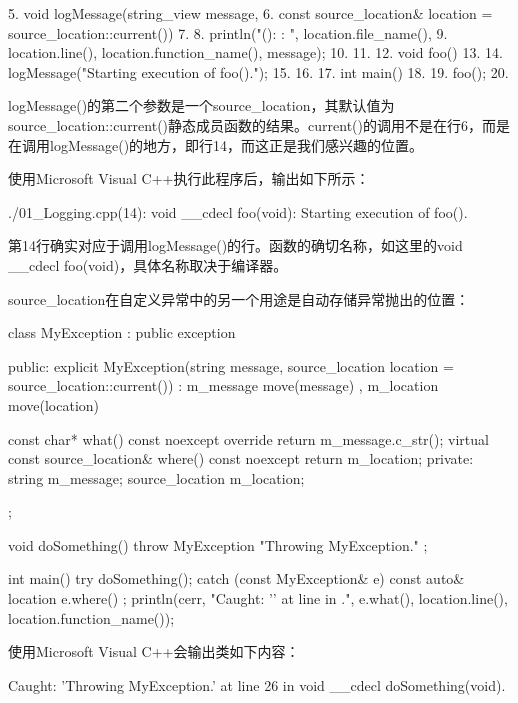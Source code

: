 \begin{shell}
5.  void logMessage(string_view message,
6.  const source_location& location = source_location::current())
7.  {
8.      println("{}({}): {}: {}", location.file_name(),
9.      location.line(), location.function_name(), message);
10. }
11.
12. void foo()
13. {
14.     logMessage("Starting execution of foo().");
15. }
16.
17. int main()
18. {
19.     foo();
20. }
\end{shell}

logMessage()的第二个参数是一个source\_location，其默认值为source\_location::current()静态成员函数的结果。current()的调用不是在行6，而是在调用logMessage()的地方，即行14，而这正是我们感兴趣的位置。

使用Microsoft Visual C++执行此程序后，输出如下所示：

\begin{shell}
./01_Logging.cpp(14): void __cdecl foo(void): Starting execution of foo().
\end{shell}

第14行确实对应于调用logMessage()的行。函数的确切名称，如这里的void \_\_cdecl foo(void)，具体名称取决于编译器。


source\_location在自定义异常中的另一个用途是自动存储异常抛出的位置：

\begin{cpp}
class MyException : public exception
{
    public:
        explicit MyException(string message,
            source_location location = source_location::current())
            : m_message { move(message) }
            , m_location { move(location) }
        { }

        const char* what() const noexcept override { return m_message.c_str(); }
        virtual const source_location& where() const noexcept{ return m_location; }
    private:
        string m_message;
        source_location m_location;
};

void doSomething()
{
    throw MyException { "Throwing MyException." };
}

int main()
{
    try {
        doSomething();
    } catch (const MyException& e) {
        const auto& location { e.where() };
        println(cerr, "Caught: '{}' at line {} in {}.",
            e.what(), location.line(), location.function_name());
    }
}
\end{cpp}

使用Microsoft Visual C++会输出类如下内容：

\begin{shell}
Caught: 'Throwing MyException.' at line 26 in void __cdecl doSomething(void).
\end{shell}



























